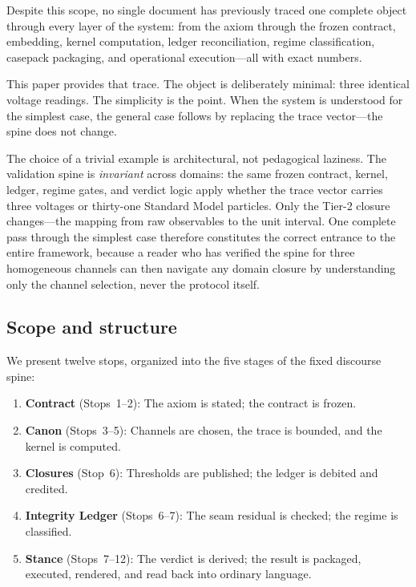 \documentclass[
  aps,
  prd,
  twocolumn,
  superscriptaddress,
  nofootinbib,
  floatfix
]{revtex4-2}
\begin{document}
Despite this scope, no single document has previously traced one
complete object through every layer of the system: from the axiom
through the frozen contract, embedding, kernel computation, ledger
reconciliation, regime classification, casepack packaging, and
operational execution---all with exact numbers.

This paper provides that trace.  The object is deliberately minimal:
three identical voltage readings.  The simplicity is the point.  When
the system is understood for the simplest case, the general case
follows by replacing the trace vector---the spine does not change.

The choice of a trivial example is architectural, not pedagogical
laziness.  The validation spine is \emph{invariant} across domains:
the same frozen contract, kernel, ledger, regime gates, and verdict
logic apply whether the trace vector carries three voltages or
thirty-one Standard Model particles.  Only the Tier-2 closure
changes---the mapping from raw observables to the unit interval.
One complete pass through the simplest case therefore constitutes
the correct entrance to the entire framework, because a reader who
has verified the spine for three homogeneous channels can then
navigate any domain closure by understanding only the channel
selection, never the protocol itself.

\subsection{Scope and structure}

We present twelve stops, organized into the five stages of the
fixed discourse spine:
\begin{enumerate}[leftmargin=*]
\item \textbf{Contract} (Stops~1--2): The axiom is stated; the
  contract is frozen.
\item \textbf{Canon} (Stops~3--5): Channels are chosen, the trace
  is bounded, and the kernel is computed.
\item \textbf{Closures} (Stop~6): Thresholds are published; the
  ledger is debited and credited.
\item \textbf{Integrity Ledger} (Stops~6--7): The seam residual is
  checked; the regime is classified.
\item \textbf{Stance} (Stops~7--12): The verdict is derived;
  the result is packaged, executed, rendered, and read back into
  ordinary language.
\end{enumerate}
\end{document}
